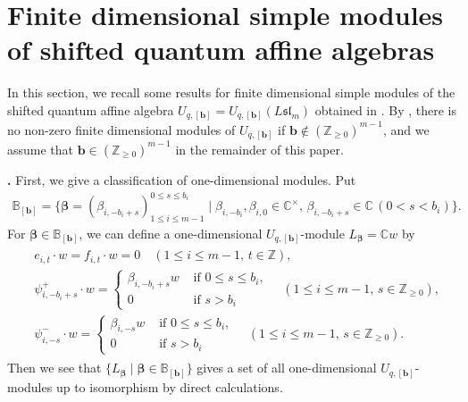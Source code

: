 \documentclass[12pt]{amsart}
\def \para{\refstepcounter{thm} \par\medskip\noindent
                \textbf{\thethm .} }
\numberwithin{equation}{thm}
\newcommand\BB{\mathbb B}
\newcommand\CC{\mathbb C}
\newcommand\ZZ{\mathbb Z}
\newcommand\bb{\mathbf b}
\renewcommand\b{\beta}   %
\newcommand\Bb{\boldsymbol\beta}
\newcommand\Fsl{\mathfrak{sl}}
\newcounter{ni}
\begin{document}


\section{Finite dimensional simple modules of shifted quantum affine algebras} 

In this section, we recall some results for finite dimensional simple modules of the shifted quantum affine algebra 
$U_{q,[\bb]} = U_{q, [\bb]}(L\Fsl_m)$ 
obtained in \cite{Her23}. 
By \cite[Proposition 6.3]{Her23}, 
there is no non-zero finite dimensional modules of $U_{q,[\bb]}$ if $\bb \not\in (\ZZ_{\geq 0})^{m-1}$, 
and we assume that $\bb \in (\ZZ_{\geq 0})^{m-1}$ in the remainder of this paper. 

\para 
First, we give a classification of one-dimensional modules. 
Put 
\begin{align*}
\BB_{[\bb]} = \{ \Bb = (\b_{i, - b_i +s})^{0 \leq s \leq b_i}_{1 \leq i \leq m-1} 
 	\mid \b_{i, - b_i}, \b_{i,0} \in \CC^{\times}, \, \b_{i, - b_i +s} \in \CC \, (0 <s< b_i) \}. 
\end{align*}
For $\Bb \in \BB_{[\bb]}$, 
we can define a one-dimensional $U_{q,[\bb]}$-module 
$L_{\Bb} = \CC w$ by 
\begin{align}
\label{def LBb} 
\begin{split}
&e_{i,t} \cdot w = f_{i,t} \cdot w =0 \quad (1\leq i \leq m-1, \, t \in \ZZ), 
\\
& \psi_{i, - b_i+s}^+ \cdot w = 
	\begin{cases} 
		\b_{i, - b_i +s} w & \text{ if } 0 \leq s \leq b_i, 
		\\
		0 & \text{ if } s > b_i 
	\end{cases} 
	\quad ( 1 \leq i \leq m-1, \, s \in \ZZ_{\geq 0} ), 
\\
& \psi_{i, -s }^- \cdot w = 
	\begin{cases}
	\b_{i, -s } w & \text{ if } 0 \leq s \leq b_i, 
	\\
	0 & \text{ if } s > b_i
	\end{cases} 
	\quad ( 1 \leq i \leq m-1, \, s \in \ZZ_{\geq 0} ).
\end{split}
\end{align}
Then we see that 
$\{ L_{\Bb} \mid \Bb \in \BB_{[\bb]}\}$ gives a set of all one-dimensional $U_{q,[\bb]}$-modules up to isomorphism 
by direct calculations. 
\end{document}
